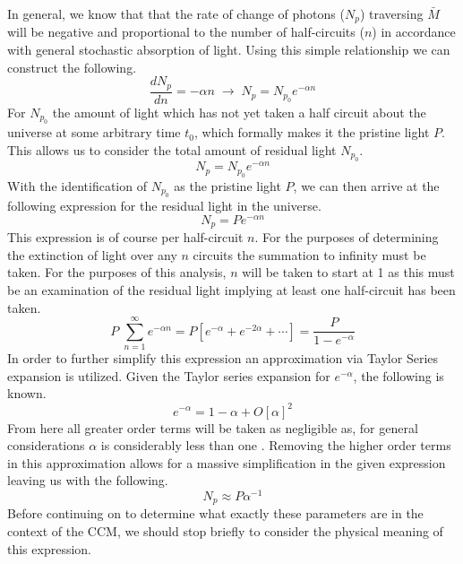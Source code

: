 \documentclass[a4paper]{article}
\begin{document}
    In general, we know that that the rate of change of photons ($N_p$)
    traversing $\bar{M}$ will be negative and proportional to the number of
    half-circuits ($n$) in accordance with general stochastic
    absorption of light. Using this simple relationship we can construct the
    following.
    \begin{equation*}
        \frac{dN_p}{dn} = -\alpha n \; \longrightarrow\; N_p=N_{p_0}e^{-\alpha n}
    \end{equation*}
    For $N_{p_0}$ the amount of light which has not yet taken a half circuit
    about the universe at some arbitrary time $t_0$, which formally makes it the
    pristine light $P$. This allows us to consider the total amount of
    residual light $N_{p_0}$.
    \begin{equation*}
        N_{p} = N_{p_0}e^{-\alpha n} 
    \end{equation*}
    With the identification of $N_{p_0}$ as the pristine light $P$, we can then
    arrive at the following expression for the residual light in the universe.
    \begin{equation}
        N_p=Pe^{-\alpha n}
    \end{equation}
    This expression is of course per half-circuit $n$. For the purposes of
    determining the extinction of light over any $n$ circuits the summation
    to infinity must be taken. For the purposes of this analysis, $n$ will be
    taken to start at 1 as this must be an examination of the residual light
    implying at least one half-circuit has been taken.
    \begin{equation*}
        P\; \sum_{n=1}^{\infty} e^{-\alpha n} = P \left[e^{-\alpha} +
            e^{-2\alpha} + \cdots \right] = \frac{P}{1-e^{-\alpha}} 
    \end{equation*}
    In order to further simplify this expression an approximation
    via Taylor Series expansion is utilized. Given the Taylor series expansion
    for $e^{-\alpha}$, the following is known.
    \begin{equation*}
        e^{-\alpha} = 1 - \alpha + O[\alpha]^2
    \end{equation*}
    From here all greater order terms will be taken as negligible as, for
    general considerations $\alpha$ is considerably less than one\footnotemark
    \cite{segal_b}. Removing the higher order terms in this approximation
    allows for a massive simplification in the given expression leaving us with
    the following.
    \begin{equation}
        N_p \approx P\alpha^{-1}
    \end{equation}
    Before continuing on to determine what exactly these parameters are in the
    context of the CCM, we should stop briefly to consider the physical meaning
    of this expression.
    
\end{document}
